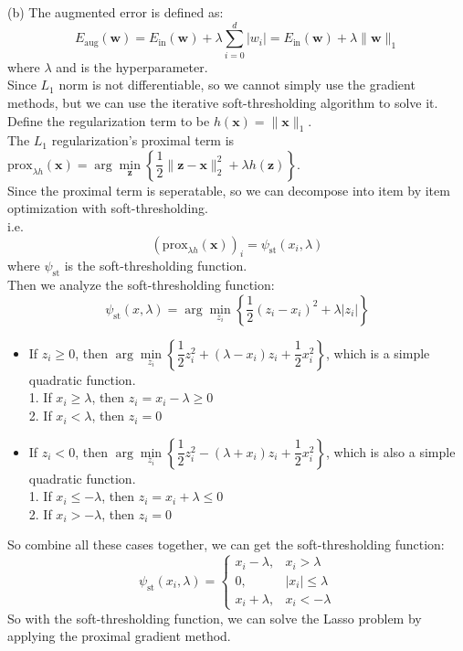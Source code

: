 (b) The augmented error is defined as:
$$E_{\text{aug}}(\mathbf{w}) = E_{\text{in}}(\mathbf{w}) + \lambda\sum_{i=0}^d|w_i| = E_{\text{in}}(\mathbf{w}) + \lambda\|\mathbf{w}\|_1$$
where $\lambda$ and is the hyperparameter.\\
Since $L_1$ norm is not differentiable, so we cannot simply use the gradient methods, but we can use the iterative soft-thresholding algorithm to solve it.\\

Define the regularization term to be $h(\mathbf{x})=\|\mathbf{x}\|_1$.\\
The $L_1$ regularization's proximal term is $\text{prox}_{\lambda h}(\mathbf{x})=\arg\min\limits_{\mathbf{z}}\left\{\dfrac{1}{2}\|\mathbf{z}-\mathbf{x}\|_2^2+\lambda h(\mathbf{z})\right\}$.\\
Since the proximal term is seperatable, so we can decompose into item by item optimization with soft-thresholding.\\
i.e.
$$(\text{prox}_{\lambda h}(\mathbf{x}))_i = \psi_{\text{st}}(x_i,\lambda)$$
where $\psi_{\text{st}}$ is the soft-thresholding function.\\
Then we analyze the soft-thresholding function:\\
$$\psi_{\text{st}}(x,\lambda) = \arg\min\limits_{z_i}\left\{\dfrac{1}{2}(z_i-x_i)^2+\lambda|z_i|\right\}$$
\begin{itemize}
    \item If $z_i\geq 0$, then $\arg\min\limits_{z_i}\left\{\dfrac{1}{2}z_i^2+(\lambda-x_i)z_i+\dfrac{1}{2}x_i^2\right\}$, which is a simple quadratic function. \\
    1. If $x_i \geq \lambda$, then $z_i = x_i-\lambda\geq 0$ \\
    2. If $x_i < \lambda$, then $z_i = 0$ \\
    \item If $z_i < 0$, then $\arg\min\limits_{z_i}\left\{\dfrac{1}{2}z_i^2-(\lambda+x_i)z_i+\dfrac{1}{2}x_i^2\right\}$, which is also a simple quadratic function. \\
    1. If $x_i \leq -\lambda$, then $z_i = x_i+\lambda\leq 0$ \\
    2. If $x_i > -\lambda$, then $z_i = 0$
\end{itemize}
So combine all these cases together, we can get the soft-thresholding function:
$$\psi_{\text{st}}(x_i,\lambda) = \begin{cases}
x_i-\lambda, & x_i > \lambda \\
0, & |x_i| \leq \lambda \\
x_i+\lambda, & x_i < -\lambda
\end{cases}$$
So with the soft-thresholding function, we can solve the Lasso problem by applying the proximal gradient method.

